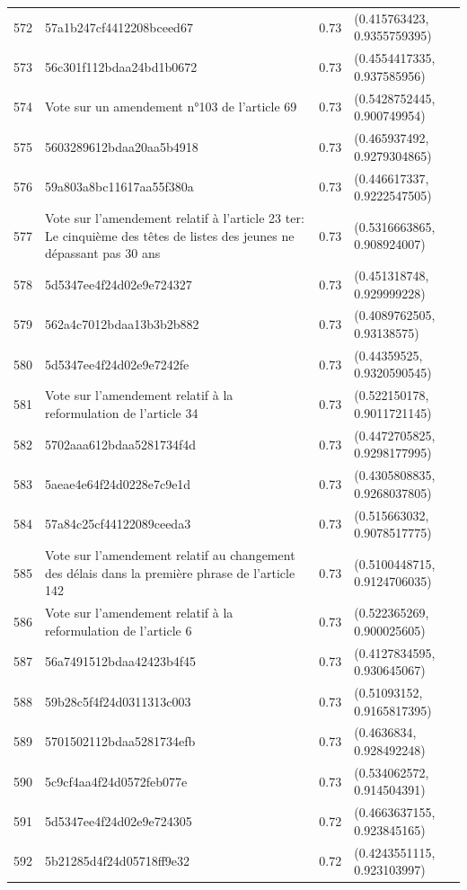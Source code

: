 \begin{table}[ht]
\begin{tabular}{rlrl}
  572 & 57a1b247cf4412208bceed67 & 0.73 & (0.415763423, 0.9355759395) \\ 
  573 & 56c301f112bdaa24bd1b0672 & 0.73 & (0.4554417335, 0.937585956) \\ 
  574 & Vote sur un amendement n°103 de l'article 69 & 0.73 & (0.5428752445, 0.900749954) \\ 
  575 & 5603289612bdaa20aa5b4918 & 0.73 & (0.465937492, 0.9279304865) \\ 
  576 & 59a803a8bc11617aa55f380a & 0.73 & (0.446617337, 0.9222547505) \\ 
  577 & Vote sur l'amendement relatif à l'article 23 ter: Le cinquième des têtes de listes des jeunes ne dépassant pas 30 ans & 0.73 & (0.5316663865, 0.908924007) \\ 
  578 & 5d5347ee4f24d02e9e724327 & 0.73 & (0.451318748, 0.929999228) \\ 
  579 & 562a4c7012bdaa13b3b2b882 & 0.73 & (0.4089762505, 0.93138575) \\ 
  580 & 5d5347ee4f24d02e9e7242fe & 0.73 & (0.44359525, 0.9320590545) \\ 
  581 & Vote sur l'amendement relatif à la reformulation de l'article 34 & 0.73 & (0.522150178, 0.9011721145) \\ 
  582 & 5702aaa612bdaa5281734f4d & 0.73 & (0.4472705825, 0.9298177995) \\ 
  583 & 5aeae4e64f24d0228e7c9e1d & 0.73 & (0.4305808835, 0.9268037805) \\ 
  584 & 57a84c25cf44122089ceeda3 & 0.73 & (0.515663032, 0.9078517775) \\ 
  585 & Vote sur l'amendement relatif au changement des délais dans la première phrase de l'article 142 & 0.73 & (0.5100448715, 0.9124706035) \\ 
  586 & Vote sur l'amendement relatif à la reformulation de l'article 6 & 0.73 & (0.522365269, 0.900025605) \\ 
  587 & 56a7491512bdaa42423b4f45 & 0.73 & (0.4127834595, 0.930645067) \\ 
  588 & 59b28c5f4f24d0311313c003 & 0.73 & (0.51093152, 0.9165817395) \\ 
  589 & 5701502112bdaa5281734efb & 0.73 & (0.4636834, 0.928492248) \\ 
  590 & 5c9cf4aa4f24d0572feb077e & 0.73 & (0.534062572, 0.914504391) \\ 
  591 & 5d5347ee4f24d02e9e724305 & 0.72 & (0.4663637155, 0.923845165) \\ 
  592 & 5b21285d4f24d05718ff9e32 & 0.72 & (0.4243551115, 0.923103997) \\ 

\end{tabular}
\end{table}
